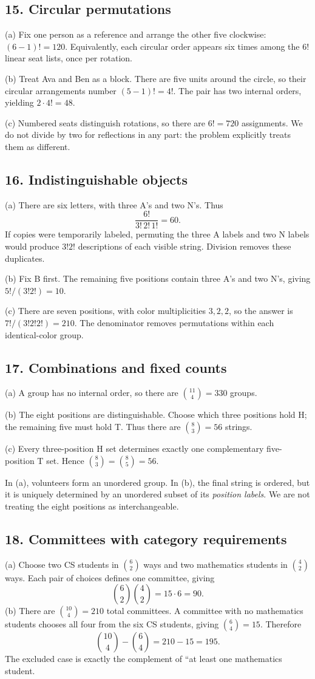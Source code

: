 \documentclass[11pt,letterpaper]{article}
\newcommand{\answer}[2]{\Needspace{2in}\subsection*{#1}#2}
\begin{document}
\answer{15. Circular permutations}{(a) Fix one person as a reference and arrange the other five clockwise: $(6-1)!=\boxed{120}$. Equivalently, each circular order appears six times among the $6!$ linear seat lists, once per rotation.

(b) Treat Ava and Ben as a block. There are five units around the circle, so their circular arrangements number $(5-1)!=4!$. The pair has two internal orders, yielding $2\cdot4!=\boxed{48}$.

(c) Numbered seats distinguish rotations, so there are $6!=\boxed{720}$ assignments. We do not divide by two for reflections in any part: the problem explicitly treats them as different.}

\answer{16. Indistinguishable objects}{(a) There are six letters, with three A's and two N's. Thus
\[
\frac{6!}{3!\,2!\,1!}=\boxed{60}.
\]
If copies were temporarily labeled, permuting the three A labels and two N labels would produce $3!2!$ descriptions of each visible string. Division removes these duplicates.

(b) Fix B first. The remaining five positions contain three A's and two N's, giving $5!/(3!2!)=\boxed{10}$.

(c) There are seven positions, with color multiplicities $3,2,2$, so the answer is $7!/(3!2!2!)=\boxed{210}$. The denominator removes permutations within each identical-color group.}

\answer{17. Combinations and fixed counts}{(a) A group has no internal order, so there are $\binom{11}{4}=\boxed{330}$ groups.

(b) The eight positions are distinguishable. Choose which three positions hold H; the remaining five must hold T. Thus there are $\binom83=\boxed{56}$ strings.

(c) Every three-position H set determines exactly one complementary five-position T set. Hence $\binom83=\binom85=56$.

In (a), volunteers form an unordered group. In (b), the final string is ordered, but it is uniquely determined by an unordered subset of its \emph{position labels}. We are not treating the eight positions as interchangeable.}

\answer{18. Committees with category requirements}{(a) Choose two CS students in $\binom62$ ways and two mathematics students in $\binom42$ ways. Each pair of choices defines one committee, giving
\[
\binom62\binom42=15\cdot6=\boxed{90}.
\]
(b) There are $\binom{10}{4}=210$ total committees. A committee with no mathematics students chooses all four from the six CS students, giving $\binom64=15$. Therefore
\[
\binom{10}{4}-\binom64=210-15=\boxed{195}.
\]
The excluded case is exactly the complement of ``at least one mathematics student.}
\end{document}
